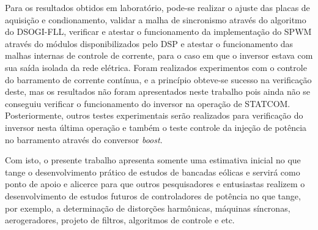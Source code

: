Para os resultados obtidos em laboratório, pode-se realizar o ajuste das placas de aquisição e condionamento, validar a malha de sincronismo 
através do algoritmo do DSOGI-FLL, verificar e atestar o funcionamento da implementação do SPWM através do módulos 
disponibilizados pelo DSP e atestar o funcionamento das malhas internas de controle de corrente, para o caso em que o inversor 
estava com sua saída isolada da rede elétrica. 
Foram realizados experimentos com o controle do barramento de corrente contínua, e a princípio obteve-se sucesso na 
verificação deste, mas os resultados não foram apresentados neste trabalho pois ainda não se conseguiu verificar o 
funcionamento do inversor na operação de STATCOM. Posteriormente, outros testes experimentais serão 
realizados para verificação do inversor nesta última operação e também o teste controle da injeção de potência 
no barramento através do conversor \textit{boost}.

Com isto, o presente trabalho apresenta somente uma estimativa inicial no que tange o
desenvolvimento prático de estudos de bancadas eólicas e servirá como ponto de apoio e
alicerce para que outros pesquisadores e entusiastas realizem o desenvolvimento 
de estudos futuros de controladores de potência no que tange, por exemplo, 
a determinação de distorções harmônicas, máquinas síncronas, aerogeradores, 
projeto de filtros, algoritmos de controle e etc. 